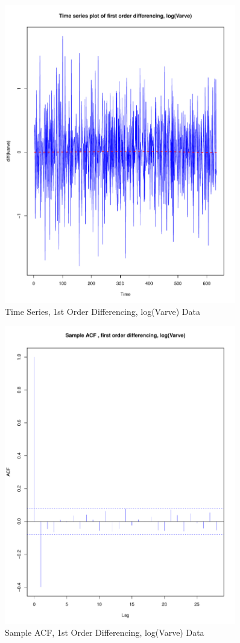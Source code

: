 \documentclass{article}
\begin{document}
\begin{figure}
	\centering
	\includegraphics[width=0.9\textwidth]{DTSDiff}
	\caption{Time Series, 1st Order Differencing, log(Varve) Data }
	\label{fig:ts-diff}
\end{figure}

\begin{figure}
	\centering
	\includegraphics[width=0.9\textwidth]{ACF-Diff}
	\caption{Sample ACF, 1st Order Differencing, log(Varve) Data }
	\label{fig:acf-diff}
\end{figure}
\end{document}
